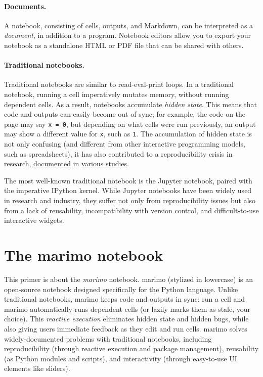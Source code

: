 \documentclass{article}
\begin{document}
\paragraph{Documents.} A notebook, consisting of cells, outputs, and Markdown,
can be interpreted as a \emph{document}, in addition to a program. Notebook
editors allow you to export your notebook as a standalone HTML or PDF
file that can be shared with others.

\paragraph{Traditional notebooks.} Traditional notebooks are similar to
read-eval-print loops. In a traditional notebook, running a cell
imperatively mutates memory, without running dependent cells. As a result,
notebooks accumulate \emph{hidden state}. This means that code and outputs can
easily become out of sync; for example, the code on the page may say \texttt{x
= 0}, but depending on what cells were run previously, an output may show a
different value for \texttt{x}, such as \texttt{1}. The accumulation of hidden
state is not only confusing (and different from other interactive programming models,
such as spreadsheets), it has also contributed to a reproducibility crisis in
research,
\href{https://leomurta.github.io/papers/pimentel2019a.pdf}{documented} in
\href{https://blog.jetbrains.com/datalore/2020/12/17/we-downloaded-10-000-000-jupyter-notebooks-from-github-this-is-what-we-learned/}{various
studies}.

The most well-known traditional notebook is the Jupyter notebook, paired with
the imperative IPython kernel. While Jupyter notebooks have been widely used in research
and industry, they suffer not only from reproducibility issues but also from a
lack of reusability, incompatibility with version control, and difficult-to-use
interactive widgets.

\section{The marimo notebook}

This primer is about the \emph{marimo} notebook. marimo (stylized in lowercase)
is an open-source notebook designed specifically for the Python language.
Unlike traditional notebooks, marimo keeps code and outputs in sync:
run a cell and marimo automatically runs dependent cells (or lazily marks them
as stale, your choice). This \emph{reactive execution} eliminates hidden
state and hidden bugs, while also giving users immediate feedback as they edit
and run cells. marimo solves widely-documented problems with traditional
notebooks, including reproducibility (through reactive execution and package
management), reusability (as Python modules and scripts), and interactivity
(through easy-to-use UI elements like sliders).
\end{document}
